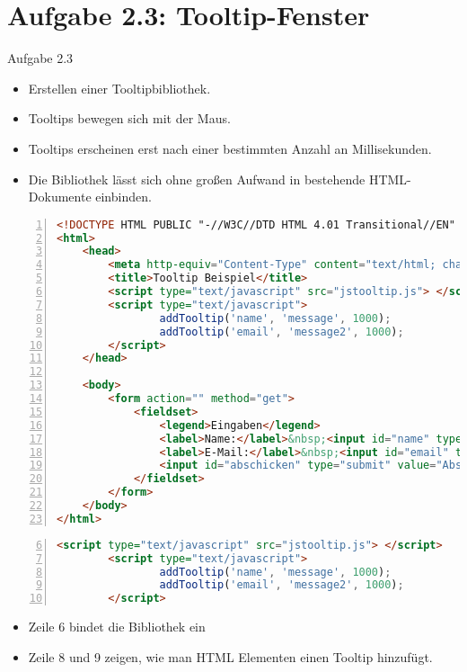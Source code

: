 \section{Aufgabe 2.3: Tooltip-Fenster}
\begin{frame}[<+->]{Aufgabe 2.3}
\normalsize
\begin{itemize}
\item Erstellen einer Tooltipbibliothek.
\item Tooltips bewegen sich mit der Maus.
\item Tooltips erscheinen erst nach einer bestimmten Anzahl an Millisekunden.
\item Die Bibliothek lässt sich ohne großen Aufwand in bestehende HTML-Dokumente einbinden.
\end{itemize}
\end{frame}
\tiny{\begin{lstlisting}[language = HTML,
                                   mathescape = true, 
                   breaklines=true, 
                   numbers = left, 
                   numbersep = 3pt]
<!DOCTYPE HTML PUBLIC "-//W3C//DTD HTML 4.01 Transitional//EN" "http://www.w3.org/TR/html4/loose.dtd">
<html>
    <head>
        <meta http-equiv="Content-Type" content="text/html; charset=utf-8">
        <title>Tooltip Beispiel</title>
        <script type="text/javascript" src="jstooltip.js"> </script>
        <script type="text/javascript">
                addTooltip('name', 'message', 1000);
                addTooltip('email', 'message2', 1000);
        </script>
    </head>
    
    <body>
		<form action="" method="get">
			<fieldset>
            	<legend>Eingaben</legend>
                <label>Name:</label>&nbsp;<input id="name" type="text"><br>
                <label>E-Mail:</label>&nbsp;<input id="email" type="text">
                <input id="abschicken" type="submit" value="Abschicken">
			</fieldset>
		</form>    	
    </body>
</html>
\end{lstlisting}
}
\normalsize
\begin{frame}[<+->][fragile]
\tiny{\begin{lstlisting}[language = HTML,
			numbers=left,
			firstnumber=6,
			numbersep = 3pt]
        <script type="text/javascript" src="jstooltip.js"> </script>
        <script type="text/javascript">
                addTooltip('name', 'message', 1000);
                addTooltip('email', 'message2', 1000);
        </script>
\end{lstlisting}}
\pause
\begin{itemize}
\normalsize
\item Zeile 6 bindet die Bibliothek ein
\item Zeile 8 und 9 zeigen, wie man HTML Elementen einen Tooltip hinzufügt.
\end{itemize}
\end{frame}
